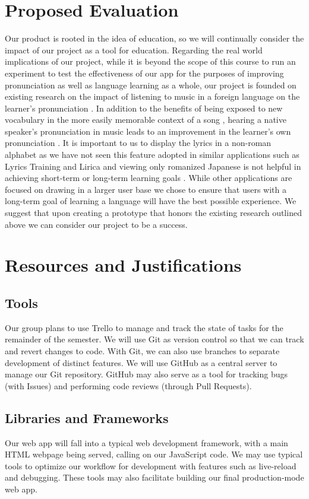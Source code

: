 \documentclass[conference, 12pt]{IEEEtran}
\begin{document}
\section{Proposed Evaluation}
Our product is rooted in the idea of education, so we will continually consider the impact of our project as a tool for education.
Regarding the real world implications of our project, while it is beyond the scope of this course to run an experiment to test the effectiveness of our app for the purposes of improving pronunciation as well as language learning as a whole, our project is founded on existing research on the impact of listening to music in a foreign language on the learner's pronunciation \cite{murphey-t}.
In addition to the benefits of being exposed to new vocabulary in the more easily memorable context of a song \cite{medina-s}, hearing a native speaker's pronunciation in music leads to an improvement in the learner's own pronunciation \cite{legg-r}.
It is important to us to display the lyrics in a non-roman alphabet as we have not seen this feature adopted in similar applications such as Lyrics Training and Lirica and viewing only romanized Japanese is not helpful in achieving short-term or long-term learning goals \cite{okuyama-y}.
While other applications are focused on drawing in a larger user base we chose to ensure that users with a long-term goal of learning a language will have the best possible experience. 
We suggest that upon creating a prototype that honors the existing research outlined above we can consider our project to be a success.

\section{Resources and Justifications}

\subsection{Tools}
Our group plans to use Trello to manage and track the state of tasks for the remainder of the semester. 
We will use Git as version control so that we can track and revert changes to code.
With Git, we can also use branches to separate development of distinct features.
We will use GitHub as a central server to manage our Git repository. 
GitHub may also serve as a tool for tracking bugs (with Issues) and performing code reviews (through Pull Requests).

\subsection{Libraries and Frameworks}
Our web app will fall into a typical web development framework, with a main HTML webpage being served, calling on our JavaScript code. 
We may use typical tools to optimize our workflow for development with features such as live-reload and debugging. 
These tools may also facilitate building our final production-mode web app.
\end{document}
